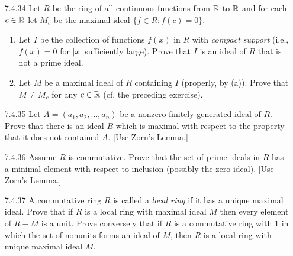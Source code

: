 \begin{enumerate}
   \item[7.4.34]  Let $R$ be the ring of all continuous functions from $\mathbb{R}$ to
                  $\mathbb{R}$ and for each $c \in \mathbb{R}$ let $M_c$ be the maximal ideal
                  $\{f \in R : f(c) = 0\}$.
                  \begin{enumerate}
                     \item Let $I$ be the collection of functions $f(x)$ in $R$
                           with \textit{compact support} (i.e., $f(x) = 0$ for
                           $|x|$ sufficiently large). Prove that $I$ is an ideal
                           of $R$ that is not a prime ideal.
                     \item Let $M$ be a maximal ideal of $R$ containing $I$
                           (properly, by (a)). Prove that $M \neq M_c$ for any
                           $c \in \mathbb{R}$ (cf. the preceding exercise).
                  \end{enumerate}
   \item[7.4.35]  Let $A = (a_1, a_2, \ldots, a_n)$ be a nonzero finitely
                  generated ideal of $R$. Prove that there is an ideal $B$ which
                  is maximal with respect to the property that it does not
                  contained $A$. [Use Zorn's Lemma.]
   \item[7.4.36]  Assume $R$ is commutative. Prove that the set of prime ideals
                  in $R$ has a minimal element with respect to inclusion
                  (possibly the zero ideal). [Use Zorn's Lemma.]
   \item[7.4.37]  A commutative ring $R$ is called a \textit{local ring} if it
                  has a unique maximal ideal. Prove that if $R$ is a local ring
                  with maximal ideal $M$ then every element of $R - M$ is a
                  unit. Prove conversely that if $R$ is a commutative ring with
                  1 in which the set of nonunits forms an ideal of $M$, then $R$
                  is a local ring with unique maximal ideal $M$.


\end{enumerate}
